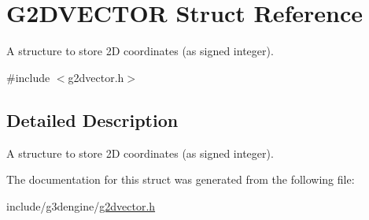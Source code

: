 \hypertarget{structG2DVECTOR}{}\section{G2\+D\+V\+E\+C\+T\+OR Struct Reference}
\label{structG2DVECTOR}


A structure to store 2D coordinates (as signed integer).  




{\ttfamily \#include $<$g2dvector.\+h$>$}



\subsection{Detailed Description}
A structure to store 2D coordinates (as signed integer). 

The documentation for this struct was generated from the following file\+:\begin{DoxyCompactItemize}
\item 
include/g3dengine/\hyperlink{g2dvector_8h}{g2dvector.\+h}\end{DoxyCompactItemize}
